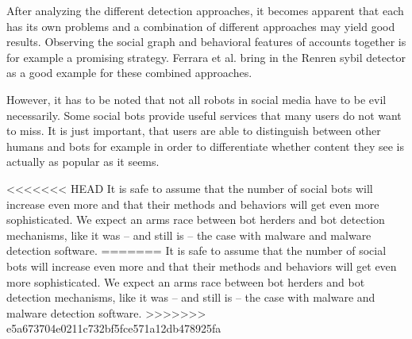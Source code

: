 After analyzing the different detection approaches, it becomes apparent that each has its own problems and a combination of different approaches may yield good results. Observing the social graph and behavioral features of accounts together is for example a promising strategy. Ferrara et al. \cite{ferrara15} bring in the Renren sybil detector \cite{wang2013, yang2014} as a good example for these combined approaches.

However, it has to be noted that not all robots in social media have to be evil necessarily. Some social bots provide useful services that many users do not want to miss. It is just important, that users are able to distinguish between other humans and bots for example in order to differentiate whether content they see is actually as popular as it seems.

<<<<<<< HEAD
It is safe to assume that the number of social bots will increase even more and that their methods and behaviors will get even more sophisticated. We expect an arms race between bot herders and bot detection mechanisms, like it was -- and still is -- the case with malware and malware detection software.
=======
It is safe to assume that the number of social bots will increase even more and that their methods and behaviors will get even more sophisticated. We expect an arms race between bot herders and bot detection mechanisms, like it was -- and still is -- the case with malware and malware detection software.
>>>>>>> e5a673704e0211c732bf5fce571a12db478925fa
